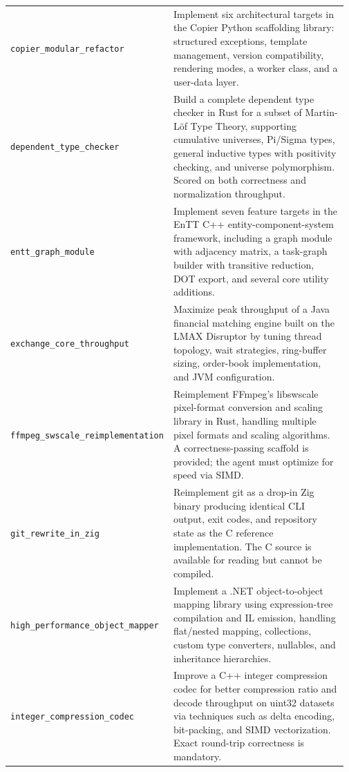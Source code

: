 \begin{longtable}{@{}>{\raggedright\arraybackslash}p{0.20\linewidth}>{\raggedright\arraybackslash}p{0.77\linewidth}@{}}
\tasknoterule
\texttt{copier\_\allowbreak{}modular\_\allowbreak{}refactor} & Implement six architectural targets in the Copier Python scaffolding library: structured exceptions, template management, version compatibility, rendering modes, a worker class, and a user-data layer. \\
\tasknoterule
\texttt{dependent\_\allowbreak{}type\_\allowbreak{}checker} & Build a complete dependent type checker in Rust for a subset of Martin-L\"{o}f Type Theory, supporting cumulative universes, Pi/Sigma types, general inductive types with positivity checking, and universe polymorphism. Scored on both correctness and normalization throughput. \\
\tasknoterule
\texttt{entt\_\allowbreak{}graph\_\allowbreak{}module} & Implement seven feature targets in the EnTT C++ entity-component-system framework, including a graph module with adjacency matrix, a task-graph builder with transitive reduction, DOT export, and several core utility additions. \\
\tasknoterule
\texttt{exchange\_\allowbreak{}core\_\allowbreak{}throughput} & Maximize peak throughput of a Java financial matching engine built on the LMAX Disruptor by tuning thread topology, wait strategies, ring-buffer sizing, order-book implementation, and JVM configuration. \\
\tasknoterule
\texttt{ffmpeg\_\allowbreak{}swscale\_\allowbreak{}reimplementation} & Reimplement FFmpeg's libswscale pixel-format conversion and scaling library in Rust, handling multiple pixel formats and scaling algorithms. A correctness-passing scaffold is provided; the agent must optimize for speed via SIMD. \\
\tasknoterule
\texttt{git\_\allowbreak{}rewrite\_\allowbreak{}in\_\allowbreak{}zig} & Reimplement git as a drop-in Zig binary producing identical CLI output, exit codes, and repository state as the C reference implementation. The C source is available for reading but cannot be compiled. \\
\tasknoterule
\texttt{high\_\allowbreak{}performance\_\allowbreak{}object\_\allowbreak{}mapper} & Implement a .NET object-to-object mapping library using expression-tree compilation and IL emission, handling flat/nested mapping, collections, custom type converters, nullables, and inheritance hierarchies. \\
\tasknoterule
\texttt{integer\_\allowbreak{}compression\_\allowbreak{}codec} & Improve a C++ integer compression codec for better compression ratio and decode throughput on uint32 datasets via techniques such as delta encoding, bit-packing, and SIMD vectorization. Exact round-trip correctness is mandatory. \\

\end{longtable}
